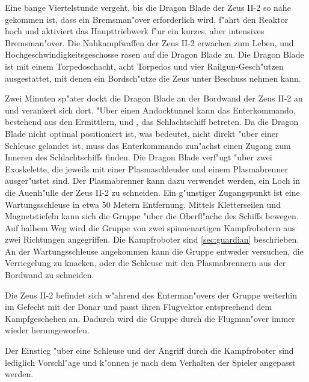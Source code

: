 Eine bange Viertelstunde vergeht, bis die Dragon Blade der Zeus II-2 so nahe gekommen ist, dass ein Bremsman"over erforderlich wird. \xl{} f"ahrt den Reaktor hoch und aktiviert das Haupttriebwerk f"ur ein kurzes, aber intensives Bremsman"over. Die Nahkampfwaffen der Zeus II-2 erwachen zum Leben, und Hochgeschwindigkeitsgeschosse rasen auf die Dragon Blade zu. Die Dragon Blade ist mit einem Torpedoschacht, acht Torpedos und vier Railgun-Gesch"utzen ausgestattet, mit denen ein Bordsch"utze die Zeus unter Beschuss nehmen kann.

Zwei Minuten sp"ater dockt die Dragon Blade an der Bordwand der Zeus II-2 an und verankert sich dort. "Uber einen Andocktunnel kann das Enterkommando, bestehend aus den Ermittlern, \xl{} und \ml{}, das Schlachtschiff betreten. Da die Dragon Blade nicht optimal positioniert ist, was bedeutet, nicht direkt "uber einer Schleuse gelandet ist, muss das Enterkommando zun"achst einen Zugang zum Inneren des Schlachtschiffs finden. Die Dragon Blade verf"ugt "uber zwei Exoskelette, die jeweils mit einer Plasmaschleuder und einem Plasmabrenner ausger"ustet sind. Der Plasmabrenner kann dazu verwendet werden, ein Loch in die Au\3enh"ulle der Zeus II-2 zu schneiden. Ein g"unstiger Zugangspunkt ist eine Wartungsschleuse in etwa 50 Metern Entfernung. Mittels Kletterseilen und Magnetstiefeln kann sich die Gruppe "uber die Oberfl"ache des Schiffs bewegen. Auf halbem Weg wird die Gruppe von zwei spinnenartigen Kampfrobotern aus zwei Richtungen angegriffen. Die Kampfroboter sind \cref{sec:guardian} beschrieben. An der Wartungsschleuse angekommen kann die Gruppe entweder versuchen, die Verriegelung zu knacken, oder die Schleuse mit den Plasmabrennern aus der Bordwand zu schneiden.

\begin{remarks}
	Die Zeus II-2 befindet sich w"ahrend des Enterman"overs der Gruppe weiterhin im Gefecht mit der Donar und passt ihren Flugvektor entsprechend dem Kampfgeschehen an. Dadurch wird die Gruppe durch die Flugman"over immer wieder herumgeworfen.

	Der Einstieg "uber eine Schleuse und der Angriff durch die Kampfroboter sind lediglich Vorschl"age und k"onnen je nach dem Verhalten der Spieler angepasst werden.
\end{remarks}
